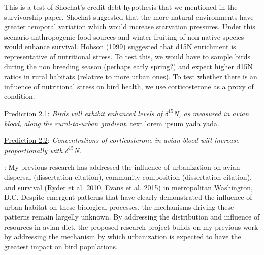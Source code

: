 \documentclass[12pt]{article}
\begin{document}

 This is a test of Shochat’s credit-debt hypothesis that we mentioned in the survivorship paper. Shochat suggested that the more natural environments have greater temporal variation which would increase starvation pressures. Under this scenario anthropogenic food sources and winter fruiting of non-native species would enhance survival. Hobson (1999) suggested that d15N enrichment is representative of nutritional stress. To test this, we would have to sample birds during the non breeding season (perhaps early spring?) and expect higher d15N ratios in rural habitats (relative to more urban ones). To test whether there is an influence of nutritional stress on bird health, we use corticosterone as a proxy of condition. \par


\noindent \underline{Prediction 2.1}: \textit{Birds will exhibit enhanced levels of $\delta^{15}$N, as measured in avian blood, along the rural-to-urban gradient.} 
text lorem ipsum yada yada. \par


\noindent \underline{Prediction 2.2}: \textit{Concentrations of corticosterone in avian blood will increase proportionally with $\delta^{15}$N.} \par \par



: 
My previous research has addressed the influence of urbanization on avian dispersal (dissertation citation), community composition (dissertation citation), and survival (Ryder et al. 2010, Evans et al. 2015) in metropolitan Washington, D.C. Despite emergent patterns that have clearly demonstrated the influence of urban habitat on these biological processes, the mechanisms driving these patterns remain largelly unknown. By addressing the distribution and influence of resources in avian diet, the proposed research project builds on my previous work by addressing the mechanism by which urbanization is expected to have the greatest impact on bird populations.

\end{document}
